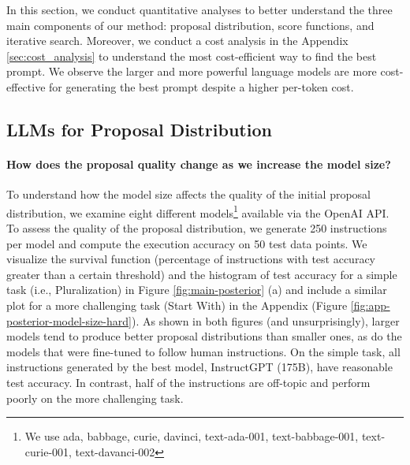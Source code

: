 In this section, we conduct quantitative analyses to better understand the three main components of our method: proposal distribution, score functions, and iterative search. Moreover, we conduct a cost analysis in the Appendix \ref{sec:cost_analysis} to understand the most cost-efficient way to find the best prompt. We observe the larger and more powerful language models are more cost-effective for generating the best prompt despite a higher per-token cost.

\subsection{LLMs for Proposal Distribution}

\paragraph{How does the proposal quality change as we increase the model size?} To understand how the model size affects the quality of the initial proposal distribution, we examine eight different models\footnote{We use ada, babbage, curie, davinci, text-ada-001, text-babbage-001, text-curie-001, text-davanci-002} available via the OpenAI API. To assess the quality of the proposal distribution, we generate 250 instructions per model and compute the execution accuracy on 50 test data points. We visualize the survival function (percentage of instructions with test accuracy greater than a certain threshold) and the histogram of test accuracy for a simple task (i.e., Pluralization) in Figure \ref{fig:main-posterior} (a) and include a similar plot for a more challenging task (Start With) in the Appendix (Figure \ref{fig:app-posterior-model-size-hard}). As shown in both figures (and unsurprisingly), larger models tend to produce better proposal distributions than smaller ones, as do the models that were fine-tuned to follow human instructions. On the simple task, all instructions generated by the best model, InstructGPT (175B), have reasonable test accuracy. In contrast, half of the instructions are off-topic and perform poorly on the more challenging task. 

